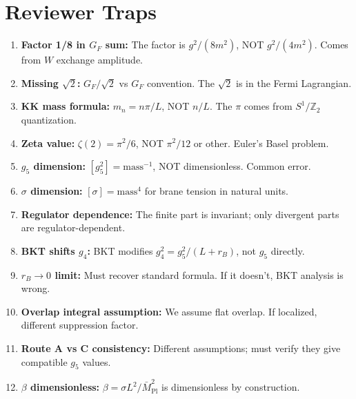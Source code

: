 \documentclass[11pt,a4paper]{article}
\begin{document}
\section{Reviewer Traps}
\label{sec:traps}

\begin{enumerate}[label=\textbf{Trap \arabic*}:]

\item \textbf{Factor 1/8 in $G_F$ sum:}
The factor is $g^2/(8m^2)$, NOT $g^2/(4m^2)$. Comes from $W$ exchange amplitude.

\item \textbf{Missing $\sqrt{2}$:}
$G_F/\sqrt{2}$ vs $G_F$ convention. The $\sqrt{2}$ is in the Fermi Lagrangian.

\item \textbf{KK mass formula:}
$m_n = n\pi/L$, NOT $n/L$. The $\pi$ comes from $S^1/\mathbb{Z}_2$ quantization.

\item \textbf{Zeta value:}
$\zeta(2) = \pi^2/6$, NOT $\pi^2/12$ or other. Euler's Basel problem.

\item \textbf{$g_5$ dimension:}
$[g_5^2] = \text{mass}^{-1}$, NOT dimensionless. Common error.

\item \textbf{$\sigma$ dimension:}
$[\sigma] = \text{mass}^4$ for brane tension in natural units.

\item \textbf{Regulator dependence:}
The finite part is invariant; only divergent parts are regulator-dependent.

\item \textbf{BKT shifts $g_4$:}
BKT modifies $g_4^2 = g_5^2/(L+r_B)$, not $g_5$ directly.

\item \textbf{$r_B \to 0$ limit:}
Must recover standard formula. If it doesn't, BKT analysis is wrong.

\item \textbf{Overlap integral assumption:}
We assume flat overlap. If localized, different suppression factor.

\item \textbf{Route A vs C consistency:}
Different assumptions; must verify they give compatible $g_5$ values.

\item \textbf{$\beta$ dimensionless:}
$\beta = \sigma L^2/\bar{M}_{\text{Pl}}^2$ is dimensionless by construction.


\end{enumerate}
\end{document}
